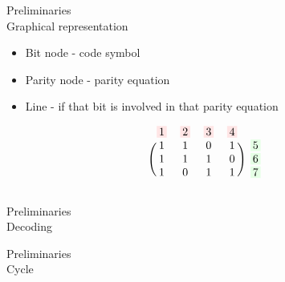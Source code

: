 \documentclass[t,13pt,graphics=pdflatex,xcolor=table,aspectratio=43]{beamer}
\newcommand{\inputTikZ}[1]{}
\begin{document}
\newcommand\colorBox[2]{\setlength{\fboxsep}{2pt}\colorbox{#1!10}{#2}}
\begin{frame}{Preliminaries \\ Graphical representation}
\begin{itemize}
  \item Bit node - code symbol 
  \item Parity node - parity equation 
  \item Line - if that bit is involved in that parity equation
\end{itemize}
\begin{minipage}[c]{.3\textwidth}
  \[
    \begin{blockarray}{ccccc}
        \colorBox{red}{1} & \colorBox{red}{2} & \colorBox{red}{3} & \colorBox{red}{4} \\
        \begin{block}{(cccc)c}
            1&1&0&1&\colorBox{green}{5}\\
            1&1&1&0&\colorBox{green}{6}\\
            1&0&1&1&\colorBox{green}{7} \\
        \end{block}
    \end{blockarray}
  \]
\end{minipage}
\begin{minipage}[c]{.68\textwidth}
\begin{figure}[!h]
  \centering
  \inputTikZ{../tikz/ex_graph1}
  \label{fig1}
\end{figure}
\end{minipage}
\end{frame}

\begin{frame}{Preliminaries \\ Decoding}
\begin{figure}[c]
  \only<1>{\inputTikZ{../tikz/decoding1}}
  \only<2>{\inputTikZ{../tikz/decoding2}}
  \only<3>{\inputTikZ{../tikz/decodingEng3}}
  \only<4>{\inputTikZ{../tikz/decodingEng4}}
\end{figure}
\end{frame}

\begin{frame}{Preliminaries \\ Cycle}
\begin{figure}[c]
  \only<1>{\inputTikZ{../tikz/cycle1}}
  \only<2>{\inputTikZ{../tikz/cycle2}}
  \only<3>{\inputTikZ{../tikz/cycleEng3}}
\end{figure}
\end{frame}
\end{document}
